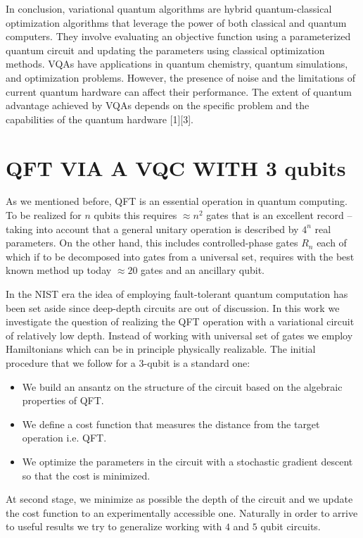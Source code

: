 \documentclass[inscr,ack,preface]{diphdthesis}
\begin{document}
In conclusion, variational quantum algorithms are hybrid quantum-classical optimization algorithms that leverage the power of both classical and quantum computers. They involve evaluating an objective function using a parameterized quantum circuit and updating the parameters using classical optimization methods. VQAs have applications in quantum chemistry, quantum simulations, and optimization problems. However, the presence of noise and the limitations of current quantum hardware can affect their performance. The extent of quantum advantage achieved by VQAs depends on the specific problem and the capabilities of the quantum hardware [1][3].


\chapter{ QFT VIA A  VQC WITH 3 qubits}

As we mentioned before, QFT is an essential operation in quantum computing. To be realized for $n$ qubits this requires 
$\approx n^2$ gates that is an excellent record --taking into account that a general unitary operation
is described by $4^n$ real parameters. On the other hand, this includes controlled-phase gates $R_n$
each of which if to be decomposed into gates from a universal set, requires with the best known
method up today $\approx 20$ gates and an ancillary qubit. 

In the NIST era the idea of employing fault-tolerant quantum computation has been set aside
since deep-depth circuits are out of discussion. In this work we investigate the question
of realizing the QFT operation with a variational circuit of relatively low depth. Instead of
working with universal set of gates we employ Hamiltonians which can be in principle physically realizable.
 The initial procedure that we follow for a $3$-qubit is a standard one:
\begin{itemize}
	\item We build an ansantz on the structure of the circuit based on the algebraic properties of QFT.
	\item We define a cost function that measures the distance from the target operation i.e. QFT.
	\item We optimize the parameters in the circuit with a stochastic gradient descent so that the cost is minimized. 
\end{itemize}
At second stage, we minimize as possible the depth of the circuit and we update the cost function to an experimentally accessible one.
Naturally in order to arrive to useful results we try to generalize working with $4$ and $5$ qubit circuits.
  
\end{document}
